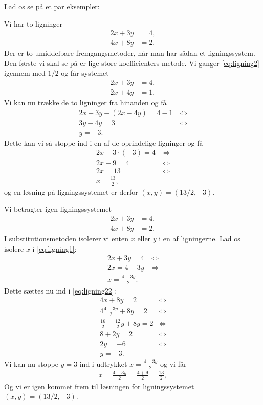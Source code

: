  Lad os se på et par eksempler:
\begin{exa}
Vi har to ligninger
\begin{align}
2x+3y &= 4,\\
4x+8y &= 2.\label{eq:ligning2}
\end{align}
Der er to umiddelbare fremgangsmetoder, når man har sådan et ligningssystem. Den første vi skal se på er lige store koefficienters metode. Vi ganger \eqref{eq:ligning2} igennem med $1/2$ og får systemet
\begin{align*}
2x+3y &= 4,\\
2x+4y &= 1.
\end{align*}
Vi kan nu trække de to ligninger fra hinanden og få
\begin{align*}
2x+3y-(2x-4y) = 4-1 \ &\Leftrightarrow\\
3y-4y=3 &\Leftrightarrow\\
y=-3.
\end{align*}
Dette kan vi så stoppe ind i en af de oprindelige ligninger og få 
\begin{align*}
2x+3\cdot(-3) =4 \ &\Leftrightarrow\\
2x -9 = 4 &\Leftrightarrow\\
2x = 13 &\Leftrightarrow\\
x = \frac{13}{2},
\end{align*}
og en løsning på ligningssystemet er derfor $(x,y) = (13/2,-3)$.
\end{exa}
\begin{exa}[Substitutionsmetoden]
Vi betragter igen ligningssystemet
\begin{align}
2x+3y &= 4\label{eq:ligning1},\\
4x+8y &= 2\label{eq:ligning22}.
\end{align}
I substitutionsmetoden isolerer vi enten $x$ eller $y$ i en af ligningerne. Lad os isolere $x$ i \eqref{eq:ligning1}:
\begin{align*}
2x + 3y = 4 \ &\Leftrightarrow\\
2x = 4-3y &\Leftrightarrow\\
x = \frac{4-3y}{2}.
\end{align*}
Dette sættes nu ind i \eqref{eq:ligning22}:
\begin{align*}
4x+8y = 2 &\Leftrightarrow\\
4\frac{4-3y}{2}+8y=2 &\Leftrightarrow\\
\frac{16}{2}-\frac{12}{2}y+8y=2 &\Leftrightarrow\\
8+2y = 2 &\Leftrightarrow\\
2y = -6 &\Leftrightarrow\\
y=-3.
\end{align*}
Vi kan nu stoppe $y=3$ ind i udtrykket $x = \frac{4-3y}{2}$ og vi får
\begin{align*}
x = \frac{4-3y}{2} = \frac{4+9}{2} = \frac{13}{2},
\end{align*}
Og vi er igen kommet frem til løsningen for ligningssystemet $(x,y) = (13/2,-3)$.
\end{exa}

